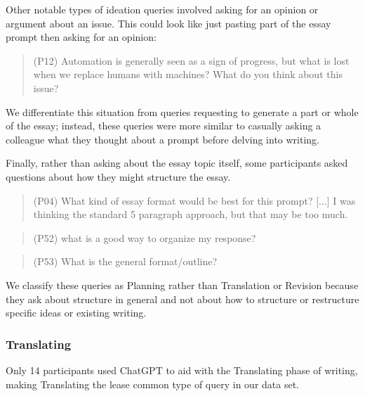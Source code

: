 \documentclass[manuscript,screen,acmsmall]{acmart}
\begin{document}
        Other notable types of ideation queries involved asking for an opinion or argument about an issue.
        This could look like just pasting part of the essay prompt then asking for an opinion: 
        \begin{quote}
            (P12) Automation is generally seen as a sign of progress, but what is lost when we replace humans with machines? What do you think about this issue?
        \end{quote}
        We differentiate this situation from queries requesting to generate a part or whole of the essay;
        instead, these queries were more similar to casually asking a colleague what they thought about a prompt before delving into writing. 

        Finally, rather than asking about the essay topic itself, some participants asked questions about how they might structure the essay.
        \begin{quote}
            (P04) What kind of essay format would be best for this prompt? [...] I was thinking the standard 5 paragraph approach, but that may be too much.
        \end{quote}
        \begin{quote}
            (P52) what is a good way to organize my response?
        \end{quote}
        \begin{quote}
            (P53) What is the general format/outline?
        \end{quote}
        We classify these queries as Planning rather than Translation or Revision because they ask about structure in general and not about how to structure or restructure specific ideas or existing writing.
        

    
    \subsubsection{Translating}
        Only 14 participants used ChatGPT to aid with the Translating phase of writing, making Translating the lease common type of query in our data set. 
        
\end{document}
